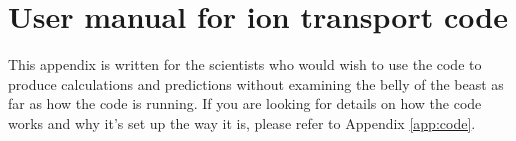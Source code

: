 \chapter{User manual for ion transport code}\label{app:manual}

This appendix is written for the scientists who would wish to use the code to produce calculations and predictions without examining the belly of the beast as far as how the code is running. If you are looking for details on how the code works and why it's set up the way it is, please refer to Appendix \ref{app:code}.